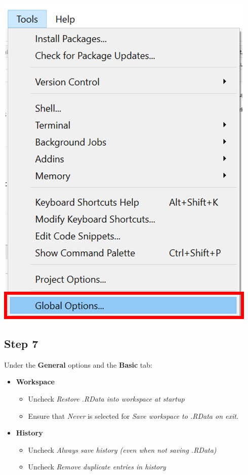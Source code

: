 \documentclass[
  letterpaper,
  DIV=11,
  numbers=noendperiod,
  oneside]{scrreprt}
\providecommand{\tightlist}{%
  \setlength{\itemsep}{0pt}\setlength{\parskip}{0pt}}\usepackage{longtable,booktabs,array}
\begin{document}
\includegraphics{images/paste-D0B6CCF0.png}

\subsection{Step 7}

Under the \textbf{General} options and the \textbf{Basic} tab:

\begin{itemize}
\tightlist
\item
  \textbf{Workspace}

  \begin{itemize}
  \item
    Uncheck \emph{Restore .RData into workspace at startup}
  \item
    Ensure that \emph{Never} is selected for \emph{Save workspace to
    .RData on exit}.
  \end{itemize}
\item
  \textbf{History}

  \begin{itemize}
  \item
    Uncheck \emph{Always save history (even when not saving .RData)}
  \item
    Uncheck \emph{Remove duplicate entries in history}
  \end{itemize}
\end{itemize}
\end{document}
